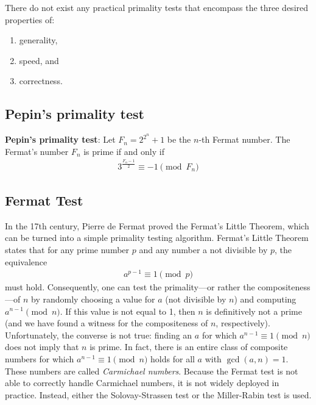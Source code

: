 \documentclass[a4paper, 12pt]{book} %
\begin{document}

There do not exist any practical primality tests that encompass the three
desired properties of: 
\begin{enumerate}
    \item generality,
    \item speed, and 
    \item correctness.
\end{enumerate}


\subsection{Pepin's primality test}

{\bf Pepin's primality test}: Let $F_n = 2^{2^n} + 1$ be the $n$-th Fermat number. The Fermat's number $F_n$ is prime if and only if 
\begin{align}
3^{\frac{F_n - 1}{2}} \equiv - 1 \pmod{F_n}    
\end{align}


\subsection{Fermat Test}

In the 17th century, Pierre de Fermat proved the Fermat's Little Theorem, which can be turned into a simple primality testing algorithm.
Fermat's Little Theorem states that for any prime number $p$ and any number a not
divisible by $p$, the equivalence 
    \begin{align}
        a^{p-1} \equiv 1 \pmod{p}
    \end{align}
must hold. Consequently, one can test the primality---or rather the compositeness---of $n$ by randomly choosing a value for $a$ (not divisible by $n$) and computing $a^{n-1} \pmod{n}$. If this value is not equal to 1, then $n$ is definitively not a prime (and we have found a witness for the compositeness of $n$, respectively). Unfortunately, the converse is not true: finding an $a$ for which $a^{n-1} \equiv 1 \pmod{n}$ does not imply that $n$ is prime. In fact, there is an entire class of composite numbers for which $a^{n-1} \equiv 1 \pmod{n}$ holds for all $a$ with $\gcd(a, n) = 1$. These numbers are called \emph{Carmichael numbers}. Because the Fermat test is not able to correctly handle Carmichael numbers, it is not widely deployed in practice. Instead, either the Solovay-Strassen test or the Miller-Rabin test is used.
\end{document}
